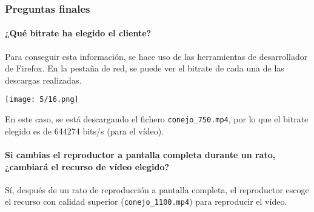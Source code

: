 \subsubsection{Preguntas finales}
\paragraph{¿Qué bitrate ha elegido el cliente?}
Para conseguir esta información, se hace uso de las herramientas de desarrollador
de Firefox. En la pestaña de red, se puede ver el bitrate de cada una de las
descargas realizadas.

\begin{minipage}{\linewidth}
	\centering
	\texttt{[image: 5/16.png]}
	\label{fig:5/16}
\end{minipage}

En este caso, se está descargando el fichero \Verb#conejo_750.mp4#, por lo que
el bitrate elegido es de 644274 bits/s (para el vídeo).

\paragraph{Si cambias el reproductor a pantalla completa durante un rato, ¿cambiará el recurso de vídeo elegido?}
Sí, después de un rato de reproducción a pantalla completa, el reproductor escoge el recurso
con calidad superior (\Verb#conejo_1100.mp4#) para reproducir el vídeo.
